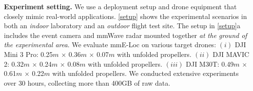 \textbf{Experiment setting.} 
We use a deployment setup and drone equipment that closely mimic real-world applications. 
\fig \ref{setup} shows the experimental scenarios in both an \textit{indoor} laboratory and an \textit{outdoor} flight test site. 
The setup in \fig \ref{setup}a includes the event camera and mmWave radar mounted together \textit{at the ground of the experimental area}.
We evaluate mmE-Loc on various target drones:
$(i)$ DJI Mini 3 Pro: 0.25$m$ $\times$ 0.36$m$ $\times$ 0.07$m$ with unfolded propellers.
$(ii)$ DJI MAVIC 2: 0.32$m$ $\times$ 0.24$m$ $\times$ 0.08$m$ with unfolded propellers.
$(iii)$ DJI M30T: 0.49$m$ $\times$ 0.61$m$ $\times$ 0.22$m$ with unfolded propellers.
We conducted extensive experiments over 30 hours, collecting more than 400GB of raw data.


